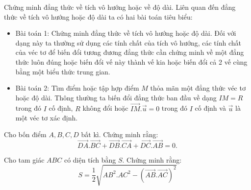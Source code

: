 \begin{dang}{Chứng minh đẳng thức về tích vô hướng hoặc về độ dài.}
	Liên quan đến đẳng thức về tích vô hướng hoặc độ dài ta có hai bài toán tiêu biểu:
	\begin{itemize}
		\item Bài toán 1: Chứng minh đẳng thức về tích vô hướng hoặc độ dài. Đối với dạng này ta thường sử dụng các tính chất của tích vô hướng, các tính chất của véc tơ để biến đổi tương đương đẳng thức cần chứng minh về một đẳng thức luôn đúng hoặc biến đổi vế này thành vế kia hoặc biến đổi cả 2 vế cùng bằng một biểu thức trung gian.
		\item Bài toán 2: Tìm điểm hoặc tập hợp điểm $M$ thỏa mãn một đẳng thức véc tơ hoặc độ dài. Thông thường ta biến đổi đẳng thức ban đầu về dạng $IM=R$ trong đó $I$ cố định, $R$ không đổi hoặc $\overrightarrow{IM}.\overrightarrow{u}=0$ trong đó $I$ cố định và $\overrightarrow{u}$ là một véc tơ xác định.
	\end{itemize}
\end{dang}
\begin{vd}%
	Cho bốn điểm $A, B, C, D$ bất kì. Chứng minh rằng:
	$$\overrightarrow{DA}.\overrightarrow{BC}+\overrightarrow{DB}.\overrightarrow{CA}+\overrightarrow{DC}.\overrightarrow{AB}=0.$$
\end{vd}
\begin{vd}%
	Cho tam giác $ABC$ có diện tích bằng $S$. Chứng minh rằng:
	$$S=\dfrac{1}{2}\sqrt{AB^2.AC^2-\left(\overrightarrow{AB}.\overrightarrow{AC}\right)^2}$$
\end{vd}
